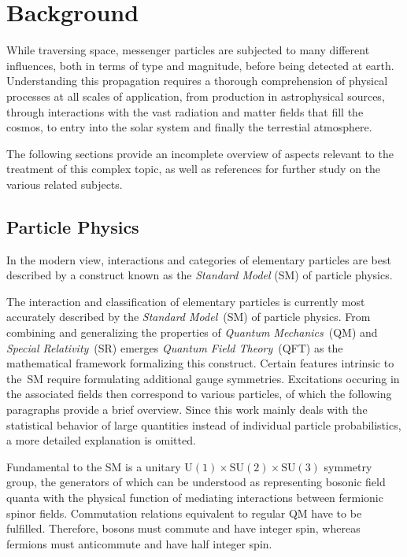 \chapter{Background}
\label{ch:background}

While traversing space, messenger particles are subjected to many different influences, both in terms of type and magnitude, before being
detected at earth. Understanding this propagation requires a thorough comprehension of physical processes at all scales of application,
from production in astrophysical sources, through interactions with the vast radiation and matter fields that fill the cosmos, to entry
into the solar system and finally the terrestial atmosphere.

The following sections provide an incomplete overview of aspects relevant to the treatment of this complex topic, as well as references
for further study on the various related subjects.

\section{Particle Physics}
\label{sec:particle}

In the modern view, interactions and categories of elementary particles are best described by a construct known as the
\emph{Standard Model} (SM) of particle physics. 



The interaction and classification of elementary particles is currently most accurately described by the \emph{Standard Model}~(SM)
of particle physics. From combining and generalizing the properties of \emph{Quantum Mechanics}~(QM) and \emph{Special Relativity}~(SR)
emerges \emph{Quantum Field Theory}~(QFT) as the mathematical framework formalizing this construct. Certain features intrinsic to the~SM
require formulating additional gauge symmetries. Excitations occuring in the associated fields then correspond to
various particles, of which the following paragraphs provide a brief overview. Since this work mainly deals with the statistical behavior
of large quantities instead of individual particle probabilistics, a more detailed explanation is omitted.

Fundamental to the SM is a unitary $\text{U}(1) \times \text{SU}(2) \times \text{SU}(3)$ symmetry group, the generators of which can be
understood as representing bosonic field quanta with the physical function of mediating interactions between fermionic spinor fields.
Commutation relations equivalent to regular QM have to be fulfilled. Therefore, bosons must commute and have integer spin, whereas
fermions must anticommute and have half integer spin.

